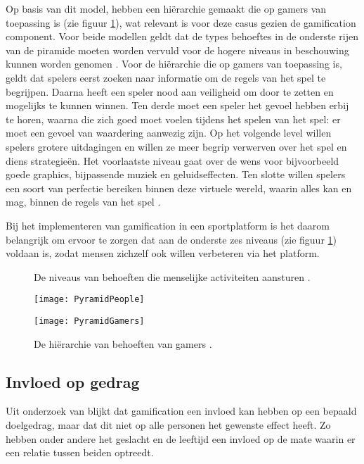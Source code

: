 Op basis van dit model, hebben \textcite{Siang2003} een hiërarchie gemaakt die op gamers van toepassing is (zie figuur \ref{fig:gamers-hierarchy}), wat relevant is voor deze casus gezien de gamification component.
Voor beide modellen geldt dat de types behoeftes in de onderste rijen van de piramide moeten worden vervuld voor de hogere niveaus in beschouwing kunnen worden genomen \autocite{Richter2014}.
Voor de hiërarchie die op gamers van toepassing is, geldt dat spelers eerst zoeken naar informatie om de regels van het spel te begrijpen. Daarna heeft een speler nood aan veiligheid om door te zetten en mogelijks te kunnen winnen. Ten derde moet een speler het gevoel hebben erbij te horen, waarna die zich goed moet voelen tijdens het spelen van het spel: er moet een gevoel van waardering aanwezig zijn. Op het volgende level willen spelers grotere uitdagingen en willen ze meer begrip verwerven over het spel en diens strategieën. Het voorlaatste niveau gaat over de wens voor bijvoorbeeld goede graphics, bijpassende muziek en geluidseffecten. Ten slotte willen spelers een soort van perfectie bereiken binnen deze virtuele wereld, waarin alles kan en mag, binnen de regels van het spel \autocite{Greitzer2007, Siang2003}.

Bij het implementeren van gamification in een sportplatform is het daarom belangrijk om ervoor te zorgen dat aan de onderste zes niveaus (zie figuur \ref{fig:gamers-hierarchy}) voldaan is, zodat mensen zichzelf ook willen verbeteren via het platform.

\begin{figure}[htbp]
    \begin{minipage}[t]{0.48\linewidth} %
        \centering
        \caption[Behoeften-hiërarchie algemeen]{De  niveaus van behoeften die menselijke activiteiten aansturen \autocite{Lilienfeld2014}.}
        \texttt{[image: PyramidPeople]}
        \label{fig:people-hierarchy}
    \end{minipage}
    \hfill
    \begin{minipage}[t]{0.48\linewidth} %
        \centering
        \caption[Behoeften-hiërarchie gamers]{De hiërarchie van behoeften van gamers \autocite{Richter2014}.}
        \texttt{[image: PyramidGamers]}
        \label{fig:gamers-hierarchy}
    \end{minipage}
\end{figure}

\subsection{Invloed op gedrag}
Uit onderzoek van \textcite{Hamari2013a} blijkt dat gamification een invloed kan hebben op een bepaald doelgedrag, maar dat dit niet op alle personen het gewenste effect heeft. Zo hebben onder andere het geslacht en de leeftijd een invloed op de mate waarin er een relatie tussen beiden optreedt.

